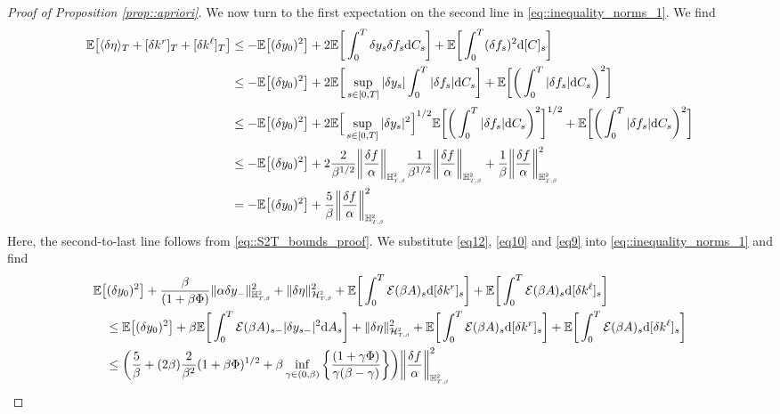\documentclass[10pt]{article} %
\newcommand\cE{\mathcal E}
\newcommand\cH{\mathcal H}
\newcommand{\smalltext}[1]{\text{\fontsize{4}{4}\selectfont$#1$}}
\def \E{\mathbb{E}}
\def \H{\mathbb{H}}
\newcommand{\1}{\mathbf{1}}
\def\d{\mathrm{d}}
\begin{document}
\begin{proof}[Proof of Proposition \ref{prop::apriori}]
\medskip
We now turn to the first expectation on the second line in \eqref{eq::inequality_norms_1}. We find
\begin{align}\label{eq12}
	\E \big[ \langle \delta\eta \rangle_T + [\delta k^r]_T + [\delta k^\ell]_T \big] 
	&\leq -\E\big[(\delta y_0)^2\big] + 2 \E\bigg[\int_0^T\delta y_{s}\delta f_s \d C_s\bigg]  + \E\bigg[\int_0^T(\delta f_s)^2\d[C]_s\bigg] \nonumber\\
	&\leq -\E\big[(\delta y_0)^2\big] + 2 \E\bigg[\sup_{s \in [0,T]}|\delta y_s|\int_0^T|\delta f_s| \d C_s\bigg]  + \E\bigg[\bigg(\int_0^T|\delta f_s|\d C_s\bigg)^2\bigg] \nonumber\\
	&\leq -\E\big[(\delta y_0)^2\big] + 2 \E\Big[\sup_{s \in [0,T]}|\delta y_s|^2\Big]^{1/2}\E\bigg[\bigg(\int_0^T |\delta f_s|\d C_s\bigg)^2\bigg]^{1/2} + \E\bigg[\bigg(\int_0^T|\delta f_s|\d C_s\bigg)^2\bigg] \nonumber\\
	&\leq -\E\big[(\delta y_0)^2\big] + 2 \frac{2}{\beta^{1/2}} \bigg\|\frac{\delta f}{\alpha}\bigg\|_{\H^\smalltext{2}_{\smalltext{T}\smalltext{,}\smalltext{\beta}}}  \frac{1}{\beta^{1/2}}\bigg\|\frac{\delta f}{\alpha}\bigg\|_{\H^\smalltext{2}_{\smalltext{T}\smalltext{,}\smalltext{\beta}}} + \frac{1}{\beta} \bigg\|\frac{\delta f}{\alpha} \bigg\|^2_{\H^\smalltext{2}_{\smalltext{T}\smalltext{,}\smalltext{\beta}}} \nonumber\\
	&= -\E\big[(\delta y_0)^2\big] + \frac{5}{\beta} \bigg\|\frac{\delta f}{\alpha}\bigg\|^2_{\H^\smalltext{2}_{\smalltext{T}\smalltext{,}\smalltext{\beta}}}
\end{align}
Here, the second-to-last line follows from \eqref{eq::S2T_bounds_proof}. We substitute \eqref{eq12}, \eqref{eq10} and \eqref{eq9} into \eqref{eq::inequality_norms_1} and find
\begin{align*}
	&\E\big[(\delta y_0)^2\big] + \frac{\beta}{(1+\beta\Phi)}\|\alpha\delta y_{-}\|^2_{\H^\smalltext{2}_{\smalltext{T}\smalltext{,}\smalltext{\beta}}} + \|\delta\eta\|^2_{\cH^\smalltext{2}_{\smalltext{T}\smalltext{,}\smalltext{\beta}}} + \E\bigg[\int_0^T \cE(\beta A)_s \d[\delta k^r]_s\bigg] + \E\bigg[\int_0^T \cE(\beta A)_s \d[\delta k^\ell]_s\bigg] \\
	&\quad\leq \E\big[(\delta y_0)^2\big] + \beta\E\bigg[\int_0^T\cE(\beta A)_{s-}|\delta y_{s-}|^2 \d A_s\bigg] + \|\delta\eta\|^2_{\cH^\smalltext{2}_{\smalltext{T}\smalltext{,}\smalltext{\beta}}} + \E\bigg[\int_0^T \cE(\beta A)_s \d[\delta k^r]_s\bigg] + \E\bigg[\int_0^T \cE(\beta A)_s \d[\delta k^\ell]_s\bigg] \\
	&\quad\leq \bigg( \frac{5}{\beta} + (2\beta)\frac{2}{\beta^2}(1+\beta\Phi)^{1/2} + \beta \inf_{\gamma \in (0,\beta)}\bigg\{\frac{(1+\gamma\Phi)}{\gamma(\beta-\gamma)}\bigg\}  \bigg)\bigg\|\frac{\delta f}{\alpha}\bigg\|^2_{\H^\smalltext{2}_{\smalltext{T}\smalltext{,}\smalltext{\beta}}} \\

\end{align*}
\end{proof}
\end{document}
